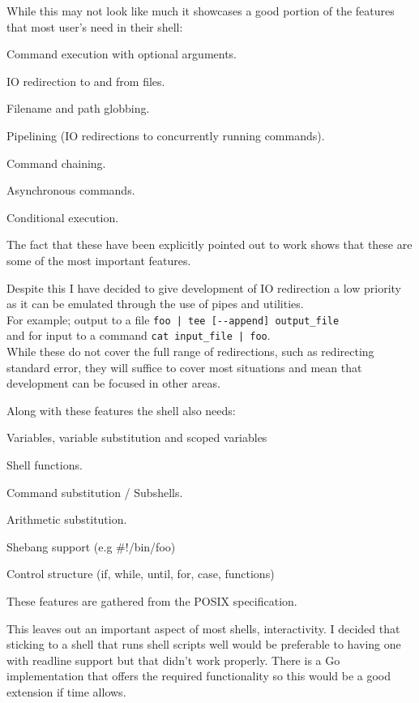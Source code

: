While this may not look like much it showcases a good portion of the features that most user's need in their shell:
\begin{itemize*}
    \item Command execution with optional arguments.
    \item IO redirection to and from files.
    \item Filename and path globbing.
    \item Pipelining (IO redirections to concurrently running commands).
    \item Command chaining.
    \item Asynchronous commands.
    \item Conditional execution.
\end{itemize*}
The fact that these have been explicitly pointed out to work shows that these are some of the most important features.

Despite this I have decided to give development of IO redirection a low priority as it can be emulated through the use of pipes and utilities. \\
For example; output to a file \verb!foo | tee [--append] output_file! \\
and for input to a command \verb!cat input_file | foo!.\\
While these do not cover the full range of redirections, such as redirecting standard error, they will suffice to cover most situations and mean that development can be focused in other areas.

Along with these features the shell also needs:
\begin{itemize*}
    \item Variables, variable substitution and scoped variables
    \item Shell functions.
    \item Command substitution / Subshells.
    \item Arithmetic substitution.
    \item Shebang support (e.g \#!/bin/foo)
    \item Control structure (if, while, until, for, case, functions)
\end{itemize*}

These features are gathered from the POSIX specification.

This leaves out an important aspect of most shells, interactivity.
I decided that sticking to a shell that runs shell scripts well would be preferable to having one with readline support but that didn't work properly. There is a Go implementation that offers the required functionality\cite{GO-READLINE} so this would be a good extension if time allows.


